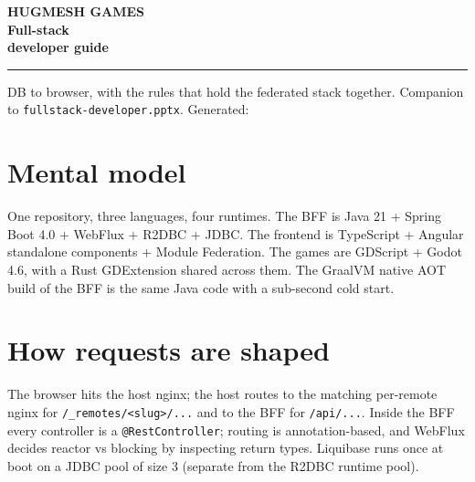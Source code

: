 \documentclass[11pt,a4paper,openany]{book}
\begin{document}
\begin{titlepage}\thispagestyle{empty}
\noindent{}
\vspace*{4cm}\noindent
{\sffamily\bfseries
  {\color{snapAccentTwo}\fontsize{18}{22}\selectfont HUGMESH GAMES}\\[3mm]
  {\color{white}\fontsize{42}{50}\selectfont Full-stack\\developer guide}\par}
\vspace{1.5cm}\noindent\color{white!75!snapAccentTwo}\rule{0.4\linewidth}{1.2pt}
\vspace{0.8cm}\noindent
{\sffamily\color{white!85}\large
DB to browser, with the rules that hold the federated stack together.}
\vfill\noindent
{\sffamily\color{white!70}\small
Companion to \texttt{fullstack-developer.pptx}. Generated: \snapbuilddate{} \snapbuildtime}
\end{titlepage}

\frontmatter\pagestyle{empty}\tableofcontents\clearpage
\mainmatter\pagestyle{fancy}

\chapter{Mental model}
One repository, three languages, four runtimes. The BFF is Java 21 +
Spring Boot 4.0 + WebFlux + R2DBC + JDBC. The frontend is TypeScript +
Angular standalone components + Module Federation. The games are
GDScript + Godot 4.6, with a Rust GDExtension shared across them. The
GraalVM native AOT build of the BFF is the same Java code with a
sub-second cold start.

\chapter{How requests are shaped}

The browser hits the host nginx; the host routes to the matching
per-remote nginx for \texttt{/\_remotes/<slug>/...} and to the BFF for
\texttt{/api/...}. Inside the BFF every controller is a
\texttt{@RestController}; routing is annotation-based, and WebFlux
decides reactor vs blocking by inspecting return types. Liquibase runs
once at boot on a JDBC pool of size 3 (separate from the R2DBC runtime
pool).
\end{document}
